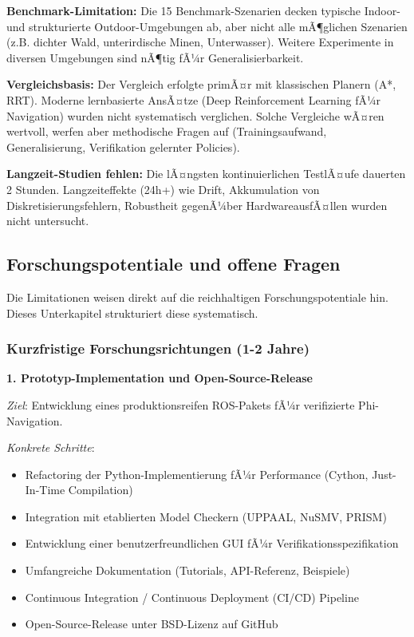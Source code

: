 ﻿\documentclass[a4paper,12pt]{article}
\theoremstyle{definition}
\begin{document}
\textbf{Benchmark-Limitation:}
Die 15 Benchmark-Szenarien decken typische Indoor- und strukturierte Outdoor-Umgebungen ab, aber nicht alle mÃ¶glichen Szenarien (z.B. dichter Wald, unterirdische Minen, Unterwasser). Weitere Experimente in diversen Umgebungen sind nÃ¶tig fÃ¼r Generalisierbarkeit.

\textbf{Vergleichsbasis:}
Der Vergleich erfolgte primÃ¤r mit klassischen Planern (A*, RRT). Moderne lernbasierte AnsÃ¤tze (Deep Reinforcement Learning fÃ¼r Navigation) wurden nicht systematisch verglichen. Solche Vergleiche wÃ¤ren wertvoll, werfen aber methodische Fragen auf (Trainingsaufwand, Generalisierung, Verifikation gelernter Policies).

\textbf{Langzeit-Studien fehlen:}
Die lÃ¤ngsten kontinuierlichen TestlÃ¤ufe dauerten 2 Stunden. Langzeiteffekte (24h+) wie Drift, Akkumulation von Diskretisierungsfehlern, Robustheit gegenÃ¼ber HardwareausfÃ¤llen wurden nicht untersucht.

\subsection{Forschungspotentiale und offene Fragen}

Die Limitationen weisen direkt auf die reichhaltigen Forschungspotentiale hin. Dieses Unterkapitel strukturiert diese systematisch.

\subsubsection{Kurzfristige Forschungsrichtungen (1-2 Jahre)}

\textbf{1. Prototyp-Implementation und Open-Source-Release}

\textit{Ziel}: Entwicklung eines produktionsreifen ROS-Pakets fÃ¼r verifizierte Phi-Navigation.

\textit{Konkrete Schritte}:
\begin{itemize}
	\item Refactoring der Python-Implementierung fÃ¼r Performance (Cython, Just-In-Time Compilation)
	\item Integration mit etablierten Model Checkern (UPPAAL, NuSMV, PRISM)
	\item Entwicklung einer benutzerfreundlichen GUI fÃ¼r Verifikationsspezifikation
	\item Umfangreiche Dokumentation (Tutorials, API-Referenz, Beispiele)
	\item Continuous Integration / Continuous Deployment (CI/CD) Pipeline
	\item Open-Source-Release unter BSD-Lizenz auf GitHub
\end{itemize}
\end{document}
